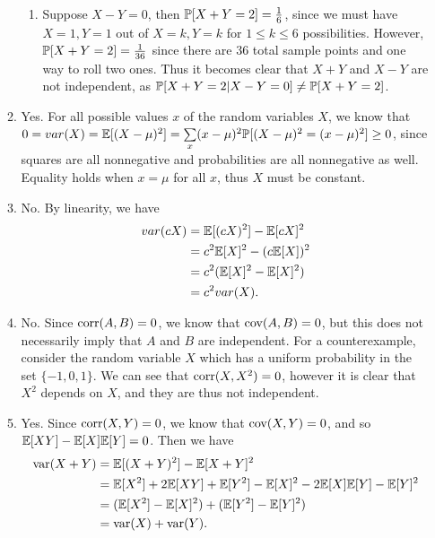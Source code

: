 \begin{enumerate}
\begin{enumerate}
\begin{enumerate}
            \item Suppose $X - Y = 0$, then $\P[X + Y = 2] = \frac{1}{6}$, since we must have $X = 1, Y = 1$ out of $X = k, Y = k$ for $1 \leq k \leq 6$ possibilities. However, $\P[X + Y = 2] = \frac{1}{36}$ since there are 36 total sample points and one way to roll two ones. Thus it becomes clear that $X + Y$ and $X - Y$ are not independent, as $\P[X + Y = 2 | X - Y = 0] \neq \P[X + Y = 2]$.
        \end{enumerate}
        
        \item Yes. For all possible values $x$ of the random variables $X$, we know that $0 = var(X) = \E[(X - \mu)^2] = \sum\limits_x(x - \mu)^2\P[(X - \mu)^2 = (x - \mu)^2] \geq 0$, since squares are all nonnegative and probabilities are all nonnegative as well. Equality holds when $x = \mu$ for all $x$, thus $X$ must be constant.
        
        \item No. By linearity, we have
        \begin{align*}
            var(cX) &= \E[(cX)^2] - \E[cX]^2 \\
                &= c^2\E[X]^2 - (c\E[X])^2 \\
                &= c^2(\E[X]^2 - \E[X]^2) \\
                &= c^2var(X).
        \end{align*}
        
        \item No. Since $\f{corr}(A, B) = 0$, we know that $\f{cov}(A, B) = 0$, but this does not necessarily imply that $A$ and $B$ are independent. For a counterexample, consider the random variable $X$ which has a uniform probability in the set $\{-1, 0, 1\}$. We can see that $\f{corr}(X, X^2) = 0$, however it is clear that $X^2$ depends on $X$, and they are thus not independent.
        
        \item Yes. Since $\f{corr}(X, Y) = 0$, we know that $\f{cov}(X, Y) = 0$, and so $\E[XY] - \E[X]\E[Y] = 0$. Then we have
        \begin{align*}
            \f{var}(X + Y) &= \E[(X + Y)^2] - \E[X + Y]^2 \\
                &= \E[X^2] + 2\E[XY] + \E[Y^2] - \E[X]^2 - 2\E[X]\E[Y] - \E[Y]^2 \\
                &= (\E[X^2] - \E[X]^2) + (\E[Y^2] - \E[Y]^2) \\
                &= \f{var}(X) + \f{var}(Y).
        \end{align*}
        

\end{enumerate}
\end{enumerate}
